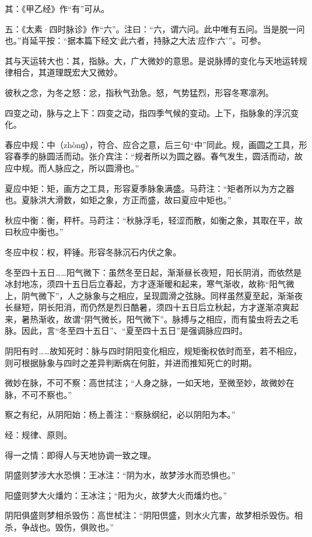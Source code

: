 \documentclass[12pt]{ctexbook}
\begin{document}
\begin{jiaozhu}
  \item 其：《甲乙经》作“有”可从。
  \item 五：《太素·四时脉诊》作“六”。注曰：“六，谓六问。此中唯有五问。当是脱一问也。”肖延平按：“据本篇下经文‘此六者，持脉之大法’应作‘六’”。可参。
  \item 其与天运转大也：其，指脉。大，广大微妙的意思。是说脉搏的变化与天地运转规律相合，其道理既宏大又微妙。
  \item 彼秋之念，为冬之怒：忿，指秋气劲急。怒，气势猛烈，形容冬寒凛冽。
  \item 四变之动，脉与之上下：四变之动，指四季气候的变动。上下，指脉象的浮沉变化。
  \item 春应中规：中（zhònɡ），符合、应合之意，后三句“中”同此。规，画圆之工具，形容春季的脉圆活而动。张介宾注：“规者所以为圆之器。春气发生，圆活而动，故应中规。而人脉应之，所以圆滑也。”
  \item 夏应中矩：矩，画方之工具，形容夏季脉象满盛。马莳注：“矩者所以为方之器也。夏脉洪大滑数，如矩之象，方正而盛，故曰夏应中矩也。”
  \item 秋应中衡：衡，秤杆。马莳注：“秋脉浮毛，轻涩而散，如衡之象，其取在平，故曰秋应中衡也。”
  \item 冬应中权：权，秤锤。形容冬脉沉石内伏之象。
  \item 冬至四十五日……阳气微下：虽然冬至日起，渐渐昼长夜短，阳长阴消，而依然是冰封地冻，须四十五日后立春起，方才逐渐暖和起来，寒气渐收，故称“阳气微上，阴气微下”，人之脉象与之相应，呈现圆滑之弦脉。同样虽然夏至起，渐渐夜长昼短，阴长阳消，而仍然是烈日酷暑，须四十五日后立秋起，方才遂渐凉爽起来，暑热渐收，故谓“阴气微长，阳气微下”。脉搏与之相应，而有蛰虫将去之毛脉。因此，言“冬至四十五日”、“夏至四十五日”是强调脉应四时。
  \item 阴阳有时……故知死时：脉与四时阴阳变化相应，规矩衡权依时而至，若不相应，则可根据脉象与四时之差异判断病在何脏，并进而推知死亡的时期。
  \item 微妙在脉，不可不察：高世拭注；“人身之脉，一如天地，至微至妙，故微妙在脉，不可不察也。”
  \item 察之有纪，从阴阳始：杨上善注：“察脉纲纪，必以阴阳为本。”
  \item 经：规律、原则。
  \item 得一之情：即得人与天地协调一致之理。
  \item 阴盛则梦涉大水恐惧：王冰注：“阴为水，故梦涉水而恐惧也。”
  \item 阳盛则梦大火燔灼：王冰注；“阳为火，故梦大火而燔灼也。”
  \item 阴阳俱盛则梦相杀毁伤：高世栻注：“阴阳倶盛，则水火亢害，故梦相杀毁伤。相杀，争战也。毁伤，俱败也。”

\end{jiaozhu}
\end{document}
